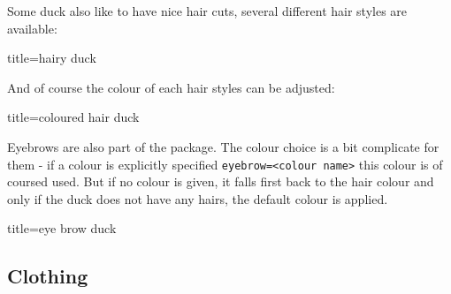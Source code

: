 \documentclass{ltxdockit}
\begin{document}
Some duck also like to have nice hair cuts, several different hair styles are available:
\begin{tcblisting}{title={hairy duck}}
\begin{tikzpicture}
	\duck[longhair]
\end{tikzpicture}
\begin{tikzpicture}
	\duck[shorthair]
\end{tikzpicture}

\begin{tikzpicture}
	\duck[crazyhair]
\end{tikzpicture}
\begin{tikzpicture}
	\duck[recedinghair]
\end{tikzpicture}
\end{tcblisting}

And of course the colour of each hair styles can be adjusted:
\begin{tcblisting}{title={coloured hair duck}}
\begin{tikzpicture}
	\duck[longhair=teal]
\end{tikzpicture}
\end{tcblisting}

Eyebrows are also part of the package. The colour choice is a bit complicate for them - if a colour is explicitly specified \verb|eyebrow=<colour name>| this colour is of coursed used. But if no colour is given, it falls first back to the hair colour and only if the duck does not have any hairs, the default colour is applied.
\begin{tcblisting}{title={eye brow duck}}
\begin{tikzpicture}
	\duck[eyebrow]
\end{tikzpicture}
\begin{tikzpicture}
	\duck[longhair=blue, 
		eyebrow]
\end{tikzpicture}

\begin{tikzpicture}
	\duck[crazyhair=red, 
		eyebrow=blue]
\end{tikzpicture}
\end{tcblisting}

\newpage
\subsection{Clothing}
\end{document}
